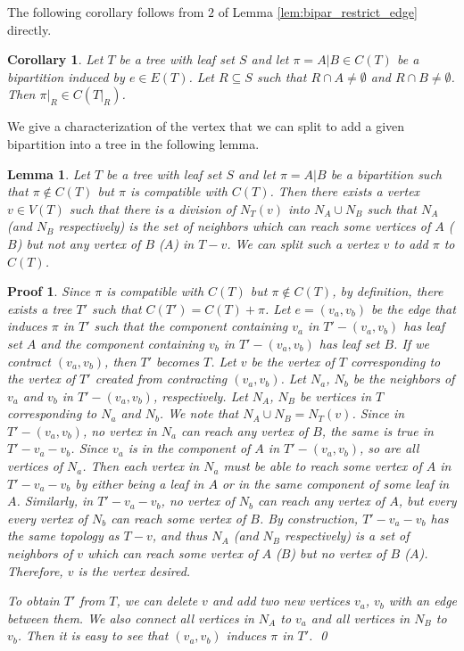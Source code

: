 \documentclass[twocolumn]{bmcart}%
\theoremstyle{mystyle}
\newtheorem{lemma}{Lemma}
\newtheorem{corollary}{Corollary}
\theoremstyle{proofstyle}
\newtheorem*{proof2}{Proof}
\newenvironment{proofnospace}{\begin{proof2}}{\qed \end{proof2}}
\begin{document}
The following corollary follows from $2$ of Lemma \ref{lem:bipar_restrict_edge} directly.
\begin{corollary} \label{cor:bipar_restrict}
    Let $T$ be a tree with leaf set $S$ and let $\pi = A|B \in C(T)$ be a bipartition induced by $e \in E(T)$. Let $R \subseteq S$ such that $R \cap A \neq \emptyset$ and $R \cap B \neq \emptyset$. Then $\pi|_R \in C(T|_R)$. 
\end{corollary}

We give a characterization of the vertex that we can split to add a given bipartition into a tree in the following lemma.
\begin{lemma} \label{lem:vertex_to_split}
    Let $T$ be a tree with leaf set $S$ and let $\pi = A|B$ be a bipartition such that $\pi \notin C(T)$ but $\pi$ is compatible with $C(T)$. Then there exists a vertex $v \in V(T)$ such that there is a division of $N_T(v)$ into $N_A \cup N_B$ such that $N_A$ (and $N_B$ respectively) is the set of neighbors which can reach some vertices of $A$ ($B$) but not any vertex of $B$ ($A$) in $T-v$. We can split such a vertex $v$ to add $\pi$ to $C(T)$.
\end{lemma}
\begin{proofnospace}
Since $\pi$ is compatible with $C(T)$ but $\pi \notin C(T)$, by definition, there exists a tree $T'$ such that $C(T') = C(T) + \pi$. Let $e = (v_a,v_b)$ be the edge that induces $\pi$ in $T'$ such that the component containing $v_a$ in $T'-(v_a,v_b)$ has leaf set $A$ and the component containing $v_b$ in $T'-(v_a,v_b)$ has leaf set $B$. If we contract $(v_a,v_b)$, then $T'$ becomes $T$. Let $v$ be the vertex of $T$ corresponding to the vertex of $T'$ created from contracting $(v_a,v_b)$. Let $N_a$, $N_b$ be the neighbors of $v_a$ and $v_b$ in $T'-(v_a,v_b)$, respectively. Let $N_A$, $N_B$ be vertices in $T$ corresponding to $N_a$ and $N_b$. We note that $N_A \cup N_B = N_T(v)$. Since in $T' -(v_a,v_b)$, no vertex in $N_a$ can reach any vertex of $B$, the same is true in $T' - v_a - v_b$. Since $v_a$ is in the component of $A$ in $T'-(v_a,v_b)$, so are all vertices of $N_a$. Then each vertex in $N_a$ must be able to reach some vertex of $A$ in $T' - v_a - v_b$ by either being a leaf in $A$ or in the same component of some leaf in $A$. Similarly, in $T' - v_a - v_b$, no vertex of $N_b$ can reach any vertex of $A$, but every every vertex of $N_b$ can reach some vertex of $B$. By construction, $T' - v_a - v_b$ has the same topology as $T - v$, and thus $N_A$ (and $N_B$ respectively) is a set of neighbors of $v$ which can reach some vertex of $A$ ($B$) but no vertex of $B$ ($A$). Therefore, $v$ is the vertex desired. 

To obtain $T'$ from $T$, we can delete $v$ and add two new vertices $v_a$, $v_b$ with an edge between them. We also connect all vertices in $N_A$ to $v_a$ and all vertices in $N_B$ to $v_b$. Then it is easy to see that $(v_a,v_b)$ induces $\pi$ in $T'$. 
\end{proofnospace}
\end{document}
